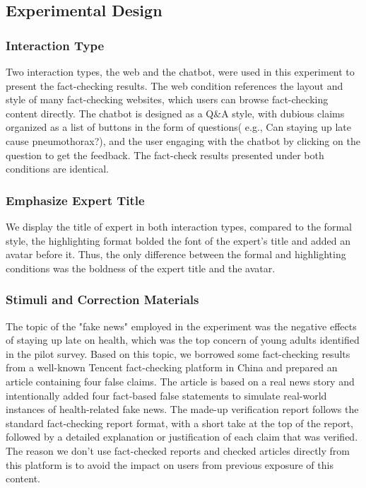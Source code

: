 \subsection{Experimental Design}
\subsubsection{Interaction Type} 
Two interaction types, the web and the chatbot, were used in this experiment to present the fact-checking results.
The web condition references the layout and style of many fact-checking websites, which users can browse fact-checking content directly.
The chatbot is designed as a Q\&A style, with dubious claims organized as a list of buttons in the form of questions( e.g., Can staying up late cause pneumothorax?), and the user engaging with the chatbot by clicking on the question to get the feedback.
The fact-check results presented under both conditions are identical.

\subsubsection{Emphasize Expert Title}
We display the title of expert in both interaction types, compared to the formal style, the highlighting format bolded the font of the expert's title and added an avatar before it.
Thus, the only difference between the formal and highlighting conditions was the boldness of the expert title and the avatar.

\subsubsection{Stimuli and Correction Materials}
The topic of the "fake news" employed in the experiment was the negative effects of staying up late on health, which was the top concern of young adults identified in the pilot survey.
Based on this topic, we borrowed some fact-checking results from a well-known Tencent fact-checking platform in China and prepared an article containing four false claims.
The article is based on a real news story and intentionally added four fact-based false statements to simulate real-world instances of health-related fake news.
The made-up verification report follows the standard fact-checking report format, with a short take at the top of the report, followed by a detailed  explanation  or justification of each claim that was verified.
The reason we don't use fact-checked reports and checked articles directly from this platform is to avoid the impact on users from previous exposure of this content.

